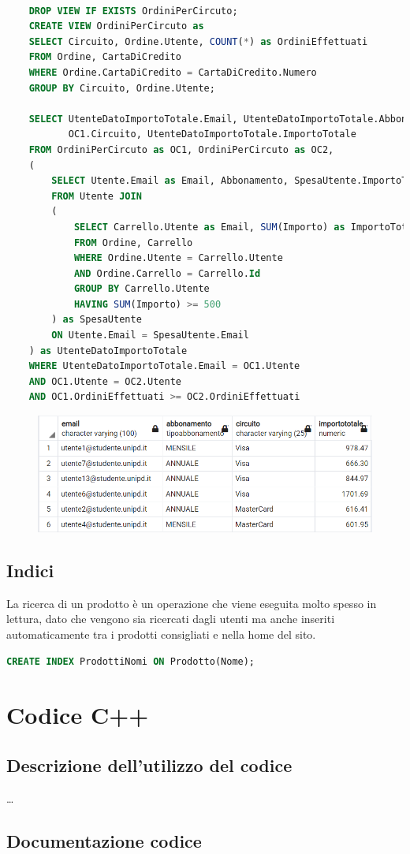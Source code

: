\documentclass[10pt]{article}
\begin{document}
\begin{lstlisting}[language=SQL]

    DROP VIEW IF EXISTS OrdiniPerCircuto;
    CREATE VIEW OrdiniPerCircuto as
    SELECT Circuito, Ordine.Utente, COUNT(*) as OrdiniEffettuati
    FROM Ordine, CartaDiCredito
    WHERE Ordine.CartaDiCredito = CartaDiCredito.Numero
    GROUP BY Circuito, Ordine.Utente;
    
    SELECT UtenteDatoImportoTotale.Email, UtenteDatoImportoTotale.Abbonamento,
           OC1.Circuito, UtenteDatoImportoTotale.ImportoTotale
    FROM OrdiniPerCircuto as OC1, OrdiniPerCircuto as OC2,
    (
        SELECT Utente.Email as Email, Abbonamento, SpesaUtente.ImportoTotale
        FROM Utente JOIN
        (
            SELECT Carrello.Utente as Email, SUM(Importo) as ImportoTotale
            FROM Ordine, Carrello
            WHERE Ordine.Utente = Carrello.Utente
            AND Ordine.Carrello = Carrello.Id
            GROUP BY Carrello.Utente
            HAVING SUM(Importo) >= 500
        ) as SpesaUtente
        ON Utente.Email = SpesaUtente.Email
    ) as UtenteDatoImportoTotale
    WHERE UtenteDatoImportoTotale.Email = OC1.Utente
    AND OC1.Utente = OC2.Utente
    AND OC1.OrdiniEffettuati >= OC2.OrdiniEffettuati
\end{lstlisting}

\begin{center}
    \begin{figure}[H]
        \includegraphics[scale=1]{media/query5.png}
        \label{query5}
    \end{figure}
\end{center}

\subsection{Indici}

La ricerca di un prodotto è un operazione che viene eseguita molto spesso in lettura, dato
che vengono sia ricercati dagli utenti ma anche inseriti automaticamente tra i prodotti consigliati
e nella home del sito.

\begin{lstlisting}[language=SQL]
    CREATE INDEX ProdottiNomi ON Prodotto(Nome);
\end{lstlisting}

\section{Codice C++}

\subsection{Descrizione dell'utilizzo del codice}

\dots

\subsection{Documentazione codice}
\end{document}
